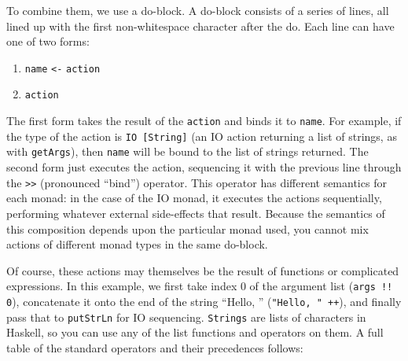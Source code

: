 To combine them, we use a do-block. A do-block consists of a series of lines, all lined up with the first non-whitespace character after the do. Each line can have one of two forms:
 
\begin{enumerate}
	\item \verb|name| \lstinline|<-| \verb|action|
	\item \verb|action|
\end{enumerate}
 
The first form takes the result of the \verb|action| and binds it to \verb|name|. For example, if the type of the action is \lstinline|IO [String]| (an IO action returning a list of strings, as with \verb|getArgs|), then \verb|name| will be bound to the list of strings returned. The second form just executes the action, sequencing it with the previous line through the \verb|>>| (pronounced ``bind'') operator. This operator has different semantics for each monad: in the case of the IO monad, it executes the actions sequentially, performing whatever external side-effects that result. Because the semantics of this composition depends upon the particular monad used, you cannot mix actions of different monad types in the same do-block.
 
Of course, these actions may themselves be the result of functions or complicated expressions. In this example, we first take index 0 of the argument list (\lstinline|args !! 0|), concatenate it onto the end of the string ``Hello, '' (\lstinline|"Hello, " ++|), and finally pass that to \lstinline|putStrLn| for IO sequencing. \verb|Strings| are lists of characters in Haskell, so you can use any of the list functions and operators on them. A full table of the standard operators and their precedences follows:
 
